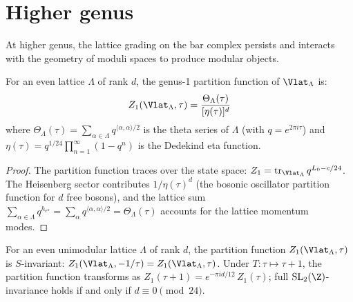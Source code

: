 
\section{Higher genus}
\label{sec:lattice:higher-genus}

At higher genus, the lattice grading on the bar complex persists and
interacts with the geometry of moduli spaces to produce modular objects.

\begin{proposition}
\label{prop:lattice:genus-1}
For an even lattice $\Lambda$ of rank $d$, the genus-1 partition
function of $\Vlat_\Lambda$ is:
\begin{equation}\label{eq:lattice:genus-1-Z}
Z_1(\Vlat_\Lambda, \tau)
= \frac{\Theta_\Lambda(\tau)}{[\eta(\tau)]^d}
\end{equation}
where $\Theta_\Lambda(\tau) = \sum_{\alpha \in \Lambda}
q^{\langle\alpha,\alpha\rangle/2}$ is the theta series of $\Lambda$
(with $q = e^{2\pi i \tau}$) and $\eta(\tau) = q^{1/24}
\prod_{n=1}^\infty (1 - q^n)$ is the Dedekind eta function.
\end{proposition}

\begin{proof}
The partition function traces over the state space:
$Z_1 = \operatorname{tr}_{\Vlat_\Lambda} q^{L_0 - c/24}$.
The Heisenberg sector contributes $1/\eta(\tau)^d$ (the bosonic
oscillator partition function for $d$ free bosons), and the lattice
sum $\sum_{\alpha \in \Lambda} q^{h_{e^\alpha}}
= \sum_\alpha q^{\langle\alpha,\alpha\rangle/2} = \Theta_\Lambda(\tau)$
accounts for the lattice momentum modes.
\end{proof}

\begin{theorem}\label{thm:lattice:modular-invariance}
For an even unimodular lattice $\Lambda$ of rank $d$, the partition
function $Z_1(\Vlat_\Lambda, \tau)$ is $S$-invariant:
$Z_1(\Vlat_\Lambda, -1/\tau) = Z_1(\Vlat_\Lambda, \tau)$.
Under $T: \tau \mapsto \tau+1$, the partition function transforms as
$Z_1(\tau+1) = e^{-\pi i d/12}\, Z_1(\tau)$; full
$\mathrm{SL}_2(\Z)$-invariance holds if and only if $d \equiv 0 \pmod{24}$.
\end{theorem}

